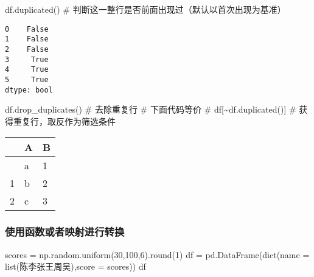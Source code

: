 \documentclass[
  letterpaper,
  DIV=11,
  numbers=noendperiod]{scrreprt}
\newenvironment{Shaded}{\begin{snugshade}}{\end{snugshade}}
\newcommand{\BuiltInTok}[1]{\textcolor[rgb]{0.00,0.23,0.31}{#1}}
\newcommand{\CommentTok}[1]{\textcolor[rgb]{0.37,0.37,0.37}{#1}}
\newcommand{\DecValTok}[1]{\textcolor[rgb]{0.68,0.00,0.00}{#1}}
\newcommand{\NormalTok}[1]{\textcolor[rgb]{0.00,0.23,0.31}{#1}}
\newcommand{\OperatorTok}[1]{\textcolor[rgb]{0.37,0.37,0.37}{#1}}
\newcommand{\StringTok}[1]{\textcolor[rgb]{0.13,0.47,0.30}{#1}}
\begin{document}
\begin{Shaded}
\begin{Highlighting}[]
\NormalTok{df.duplicated() }\CommentTok{\# 判断这一整行是否前面出现过（默认以首次出现为基准）}
\end{Highlighting}
\end{Shaded}

\begin{verbatim}
0    False
1    False
2    False
3     True
4     True
5     True
dtype: bool
\end{verbatim}

\begin{Shaded}
\begin{Highlighting}[]
\NormalTok{df.drop\_duplicates() }\CommentTok{\# 去除重复行}
\CommentTok{\# 下面代码等价}
\CommentTok{\# df[\textasciitilde{}df.duplicated()] \# 获得重复行，取反作为筛选条件}
\end{Highlighting}
\end{Shaded}

\begin{longtable}[]{@{}lll@{}}
\toprule\noalign{}
& A & B \\
\midrule\noalign{}
\endhead
\bottomrule\noalign{}
\endlastfoot
0 & a & 1 \\
1 & b & 2 \\
2 & c & 3 \\
\end{longtable}

\hypertarget{ux4f7fux7528ux51fdux6570ux6216ux8005ux6620ux5c04ux8fdbux884cux8f6cux6362}{%
\subsubsection{使用函数或者映射进行转换}\label{ux4f7fux7528ux51fdux6570ux6216ux8005ux6620ux5c04ux8fdbux884cux8f6cux6362}}

\begin{Shaded}
\begin{Highlighting}[]
\NormalTok{scores }\OperatorTok{=}\NormalTok{ np.random.uniform(}\DecValTok{30}\NormalTok{,}\DecValTok{100}\NormalTok{,}\DecValTok{6}\NormalTok{).}\BuiltInTok{round}\NormalTok{(}\DecValTok{1}\NormalTok{)}
\NormalTok{df }\OperatorTok{=}\NormalTok{ pd.DataFrame(}\BuiltInTok{dict}\NormalTok{(name }\OperatorTok{=} \BuiltInTok{list}\NormalTok{(}\StringTok{\textquotesingle{}陈李张王周吴\textquotesingle{}}\NormalTok{),score }\OperatorTok{=}\NormalTok{ scores))}
\NormalTok{df}
\end{Highlighting}
\end{Shaded}
\end{document}
